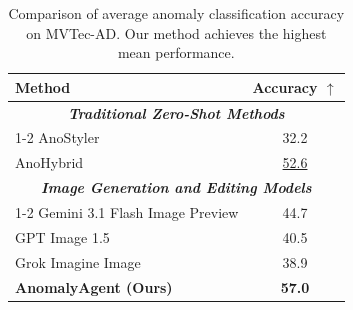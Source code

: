 \documentclass[sigconf]{acmart}
\begin{document}
\begin{table}[t]
\centering
\caption{Comparison of average anomaly classification accuracy on MVTec-AD. Our method achieves the highest mean performance.}
\label{tab:classification}
\small
\setlength{\tabcolsep}{2pt} %
\begin{tabular}{l|c}
\toprule
\textbf{Method} & \textbf{Accuracy $\uparrow$} \\
\midrule
\multicolumn{2}{c}{\textbf{\textit{Traditional Zero-Shot Methods}}} \\
\cmidrule(lr){1-2}
AnoStyler\cite{DBLP:journals/corr/abs-2511-06687} & 32.2 \\
AnoHybrid\cite{DBLP:conf/cvpr/Zhao25}      & \underline{52.6} \\
\midrule
\multicolumn{2}{c}{\textbf{\textit{Image Generation and Editing Models}}} \\
\cmidrule(lr){1-2}
Gemini 3.1 Flash Image Preview & 44.7 \\
GPT Image 1.5 & 40.5 \\
Grok Imagine Image & 38.9 \\
\midrule
\rowcolor{cyan!5} %
\textbf{AnomalyAgent (Ours)}                & \textbf{57.0} \\
\bottomrule
\end{tabular}
\end{table}
\end{document}
